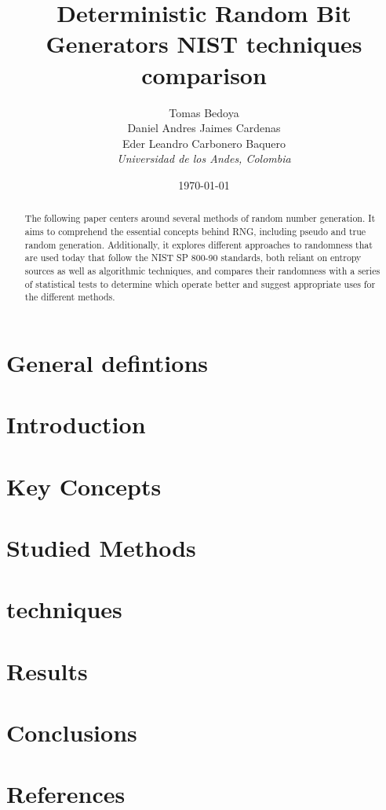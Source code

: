 \documentclass[conference]{IEEEtran}
\title{Deterministic Random Bit Generators NIST techniques comparison}
\author{
    Tomas Bedoya \\
    Daniel Andres Jaimes Cardenas \\
    Eder Leandro Carbonero Baquero \\
    \textit{Universidad de los Andes, Colombia}
}
\date{\today}
\begin{document}
\maketitle
\begin{abstract}
The following paper centers around several methods of random number generation. It aims to comprehend the essential concepts behind RNG, including pseudo and true random generation. Additionally, it explores different approaches to randomness that are used today that follow the NIST SP 800-90 standards, both reliant on entropy sources as well as algorithmic techniques, and compares their randomness with a series of statistical tests to determine which operate better and suggest appropriate uses for the different methods.

\end{abstract}

\section*{General defintions}


\section{Introduction}


\section{Key Concepts}


\section{Studied Methods}


\section{techniques}


\section{Results}


\section{Conclusions}


\section*{References}  

\end{document}
